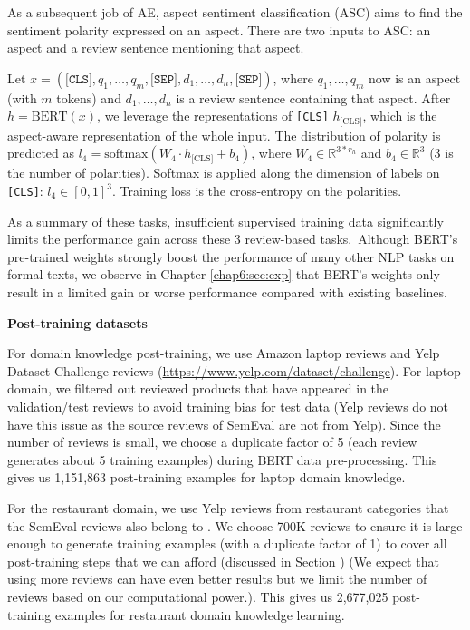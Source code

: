 As a subsequent job of AE, aspect sentiment classification (ASC) aims to find the sentiment polarity expressed on an aspect.
There are two inputs to ASC: an aspect and a review sentence mentioning that aspect.

Let $x=(\texttt{[CLS]}, q_1, \dots, q_m, \texttt{[SEP]}, d_1, \dots, d_n, \texttt{[SEP]})$, where $q_1, \dots, q_m$ now is an aspect (with $m$ tokens) and $d_1, \dots, d_n$ is a review sentence containing that aspect.
After $h=\text{BERT}(x)$, we leverage the representations of \texttt{[CLS]} $h_{\text{[CLS]}}$, which is the aspect-aware representation of the whole input.
The distribution of polarity is predicted as $l_4=\text{softmax}(W_4 \cdot h_{\text{[CLS]}} + b_4)$, where $W_4 \in \mathbb{R}^{3*r_h}$ and $b_4 \in \mathbb{R}^3$ (3 is the number of polarities). Softmax is applied along the dimension of labels on \texttt{[CLS]}: $l_4 \in [0, 1]^{3}$.
Training loss is the cross-entropy on the polarities.

As a summary of these tasks, insufficient supervised training data significantly limits the performance gain across these 3 review-based tasks.~Although BERT's pre-trained weights strongly boost the performance of many other NLP tasks on formal texts, we observe in Chapter \ref{chap6:sec:exp} that BERT's weights only result in a limited gain or worse performance compared with existing baselines.

\textbf{Post-training datasets}

For domain knowledge post-training, we use Amazon laptop reviews \cite{HeMcA16a} and Yelp Dataset Challenge reviews (\url{https://www.yelp.com/dataset/challenge}).
For laptop domain, we filtered out reviewed products that have appeared in the validation/test reviews to avoid training bias for test data (Yelp reviews do not have this issue as the source reviews of SemEval are not from Yelp). 
Since the number of reviews is small, we choose a duplicate factor of 5 (each review generates about 5 training examples) during BERT data pre-processing.
This gives us 
1,151,863 post-training examples for laptop domain knowledge.

For the restaurant domain, we use Yelp reviews from restaurant categories that the SemEval reviews also belong to \cite{xu_acl2018}.
We choose 700K reviews to ensure it is large enough to generate training examples (with a duplicate factor of 1) to cover all post-training steps that we can afford (discussed in Section 
) (We expect that using more reviews can have even better results but we limit the number of reviews based on our computational power.).
This gives us 2,677,025 post-training examples for restaurant domain knowledge learning.

